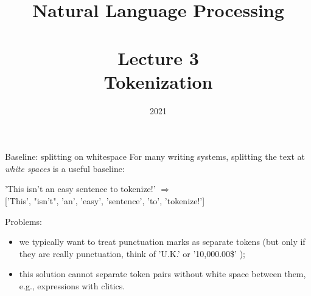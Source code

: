\documentclass[style=upen, size=14pt]{powerdot}
\begin{document}
\title{Natural Language Processing\\~~\\Lecture 3\\Tokenization}

\date{2021}
\maketitle

\begin{slide}[toc=Whitespace splitting]{Baseline: splitting on whitespace}
  For many writing systems, splitting the text at \emph{white spaces} is a
  useful baseline:\bigskip

  'This isn't an easy sentence to tokenize!' $\Rightarrow$ \\
  
  ['This', "isn't", 'an', 'easy', 'sentence', 'to', 'tokenize!']\bigskip

  Problems:
  \begin{itemize}
  \item we typically want to treat punctuation marks as separate tokens (but
    only if they are really punctuation, think of 'U.K.' or '10,000.00\$' );
  \item this solution cannot separate token pairs without white space between
    them, e.g., expressions with clitics.
  \end{itemize}
\end{slide}
\end{document}
